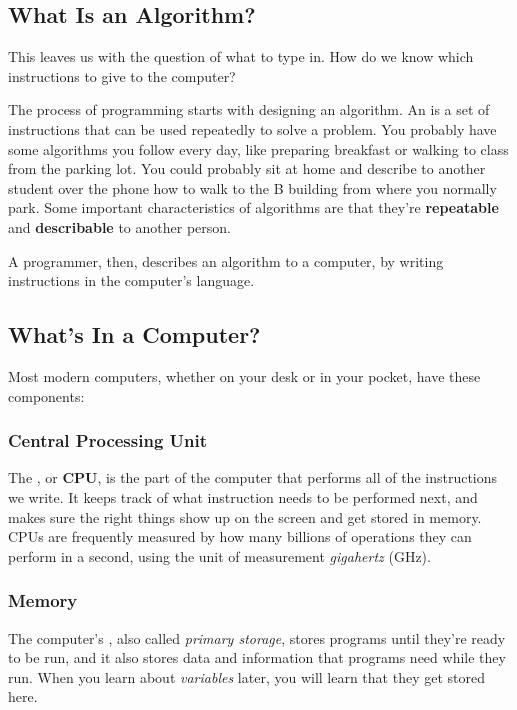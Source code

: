 \subsection{What Is an Algorithm?}

This leaves us with the question of what to type in.  How do we know which instructions to give to the computer?

The process of programming starts with designing an algorithm.  An  is a set of instructions that can be used repeatedly to solve a problem.  You probably have some algorithms you follow every day, like preparing breakfast or walking to class from the parking lot.  You could probably sit at home and describe to another student over the phone how to walk to the B building from where you normally park.  Some important characteristics of algorithms are that they're \textbf{repeatable} and \textbf{describable} to another person.

A programmer, then, describes an algorithm to a computer, by writing instructions in the computer's language.

\subsection{What's In a Computer?}

Most modern computers, whether on your desk or in your pocket, have these components:
\subsubsection{Central Processing Unit}
The , or \textbf{CPU}, is the part of the computer that performs all of the instructions we write.  It keeps track of what instruction needs to be performed next, and makes sure the right things show up on the screen and get stored in memory.  CPUs are frequently measured by how many billions of operations they can perform in a second, using the unit of measurement \textit{gigahertz} (GHz).

\subsubsection{Memory}
\label{sec:memory}
The computer's , also called \textit{primary storage}, stores programs until they're ready to be run, and it also stores data and information that programs need while they run.  When you learn about \textit{variables} later, you will learn that they get stored here.

